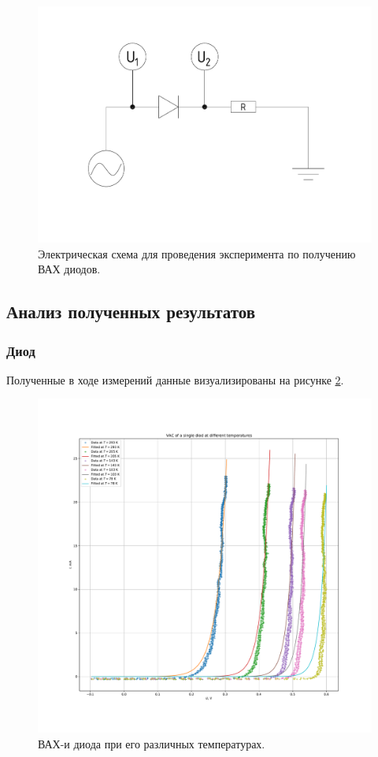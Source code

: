 \documentclass[a4paper, 12pt]{article}
\begin{document}
\begin{figure}[H]
	\centering
	\includegraphics[width=\linewidth]{2_Experiment_Scheme}
	\caption{Электрическая схема для проведения эксперимента по получению ВАХ диодов.}
	\label{fig:2_Experiment_Scheme}
\end{figure}

\subsection{Анализ полученных результатов}

\subsubsection{Диод}

Полученные в ходе измерений данные визуализированы на рисунке \ref{fig:2_Diode}.

\begin{figure}[H]
	\centering
	\includegraphics[width=\linewidth]{2_Diode}
	\caption{ВАХ-и диода при его различных температурах.}
	\label{fig:2_Diode}
\end{figure}
\end{document}
